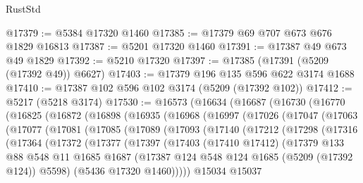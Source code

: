 \begin{lexlean}{RustStd}
\begin{coremodule}
@17379 := @5384 @17320 @1460
@17385 := @17379 @69 @707 @673 @676 @1829 @16813
@17387 := @5201 @17320 @1460
@17391 := @17387 @49 @673 @49 @1829
@17392 := @5210 @17320
@17397 := @17385 (@17391 (@5209 (@17392 @49)) @6627)
@17403 := @17379 @196 @135 @596 @622 @3174 @1688
@17410 := @17387 @102 @596 @102 @3174 (@5209 (@17392 @102))
@17412 := @5217 (@5218 @3174)
@17530 := @16573
    (@16634
      (@16687
        (@16730
          (@16770
            (@16825
              (@16872
                (@16898
                  (@16935
                    (@16968
                      (@16997
                        (@17026
                          (@17047
                            (@17063
                              (@17077
                                (@17081
                                  (@17085
                                    (@17089
                                      (@17093
                                        (@17140
                                          (@17212
                                            (@17298
                                              (@17316
                                                (@17364
                                                  (@17372
                                                    (@17377
                                                      (@17397
                                                        (@17403
                                                          (@17410 @17412)
                                                          (@17379
                                                            @133
                                                            @88
                                                            @548
                                                            @11
                                                            @1685
                                                            @1687
                                                            (@17387
                                                              @124
                                                              @548
                                                              @124
                                                              @1685
                                                              (@5209 (@17392 @124))
                                                              @5598)
                                                            (@5436 @17320 @1460)))))
                                                    @15034
                                                    @15037

\end{coremodule}
\end{lexlean}
